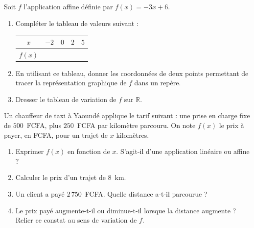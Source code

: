 \documentclass[11pt]{article}
\begin{document}
\begin{exercice}
Soit $f$ l'application affine définie par $f(x)=-3x+6$.
\begin{enumerate}
\item Compléter le tableau de valeurs suivant :
\begin{center}
\begin{tabular}{|c|c|c|c|c|}
\hline
$x$ & $-2$ & $0$ & $2$ & $5$ \\
\hline
$f(x)$ & & & & \\
\hline
\end{tabular}
\end{center}
\item En utilisant ce tableau, donner les coordonnées de deux points permettant de tracer la représentation graphique de $f$ dans un repère.
\item Dresser le tableau de variation de $f$ sur $\mathbb{R}$.
\end{enumerate}
\end{exercice}

\begin{exercice}
Un chauffeur de taxi à Yaoundé applique le tarif suivant : une prise en charge fixe de $500$~FCFA, plus $250$~FCFA par kilomètre parcouru. On note $f(x)$ le prix à payer, en FCFA, pour un trajet de $x$ kilomètres.
\begin{enumerate}
\item Exprimer $f(x)$ en fonction de $x$. S'agit-il d'une application linéaire ou affine ?
\item Calculer le prix d'un trajet de $8$~km.
\item Un client a payé $2\,750$~FCFA. Quelle distance a-t-il parcourue ?
\item Le prix payé augmente-t-il ou diminue-t-il lorsque la distance augmente ? Relier ce constat au sens de variation de $f$.
\end{enumerate}
\end{exercice}
\end{document}
